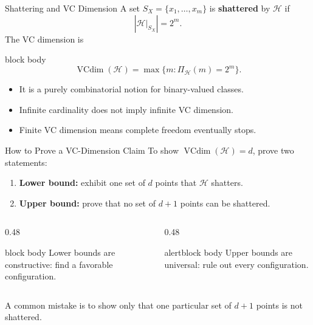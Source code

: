\documentclass[aspectratio=169,10pt]{beamer}
\newcommand{\Hc}{\mathcal{H}}
\newcommand{\PiH}{\Pi_{\Hc}}
\newcommand{\vcdim}{\operatorname{VCdim}}
\newcommand{\abs}[1]{\left\lvert #1\right\rvert}
\newcommand{\KeyBox}[1]{%
  \begin{beamercolorbox}[rounded=true,sep=0.22cm,wd=\linewidth]{block body}
    #1
  \end{beamercolorbox}%
}
\newcommand{\OrangeBox}[1]{%
  \begin{beamercolorbox}[rounded=true,sep=0.22cm,wd=\linewidth]{alertblock body}
    #1
  \end{beamercolorbox}%
}
\begin{document}
\begin{frame}[t]{Shattering and VC Dimension}
  \vspace{0.04cm}
  A set $S_X=\{x_1,\ldots,x_m\}$ is \textbf{shattered} by $\Hc$ if
  \[
    \abs{\Hc\vert_{S_X}}=2^m.
  \]
  The VC dimension is
  \begin{beamercolorbox}[rounded=true,sep=0.20cm,wd=\linewidth]{block body}
    \[
      \boxed{
      \vcdim(\Hc)=\max\{m:\PiH(m)=2^m\}.}
    \]
  \end{beamercolorbox}
  \vspace{0.15cm}
  \begin{itemize}
    \setlength{\itemsep}{0.10cm}
    \item It is a purely combinatorial notion for binary-valued classes.
    \item Infinite cardinality does not imply infinite VC dimension.
    \item Finite VC dimension means complete freedom eventually stops.
  \end{itemize}
\end{frame}

\begin{frame}[t]{How to Prove a VC-Dimension Claim}
  \vspace{0.05cm}
  To show $\vcdim(\Hc)=d$, prove two statements:
  \vspace{0.05cm}
  \begin{enumerate}
    \setlength{\itemsep}{0.18cm}
    \item \textbf{Lower bound:} exhibit one set of $d$ points that $\Hc$ shatters.
    \item \textbf{Upper bound:} prove that no set of $d+1$ points can be shattered.
  \end{enumerate}
  \vspace{0.10cm}
  \begin{columns}[T,totalwidth=\textwidth]
    \begin{column}{0.48\textwidth}
      \KeyBox{Lower bounds are constructive: find a favorable configuration.}
    \end{column}
    \begin{column}{0.48\textwidth}
      \OrangeBox{Upper bounds are universal: rule out every configuration.}
    \end{column}
  \end{columns}
  \vspace{0.12cm}
  A common mistake is to show only that one particular set of $d+1$ points is not shattered.
\end{frame}
\end{document}
